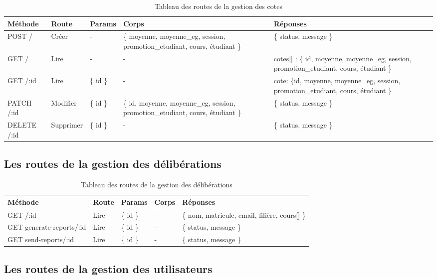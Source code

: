\begin{table}[ht]
  \caption{Tableau des routes de la gestion des cotes}
  \label{tab:routes-grade}
  \begin{tabular}{|p{1.5cm}|p{1cm}|p{1cm}|p{3cm}|p{4cm}| }
    \hline
    Méthode & Route & Params & Corps & Réponses \\
    \hline
        POST /  & Créer &  - &\{ moyenne, moyenne\_eg, session, promotion\_etudiant, cours, étudiant \} & \{ status, message \} \\
    \hline
        GET  / & Lire & - & - & cotes[] :  \{ id, moyenne, moyenne\_eg, session, promotion\_etudiant, cours, étudiant \} \\
    \hline
        GET  /:id  & Lire & \{ id \} & - & cote: \{id, moyenne, moyenne\_eg, session, promotion\_etudiant, cours, étudiant \} \\
    \hline
        PATCH /:id  & Modifier & \{ id \} & \{ id, moyenne, moyenne\_eg, session, promotion\_etudiant, cours, étudiant \} & \{ status, message \} \\
    \hline
        DELETE  /:id & Supprimer  & \{ id \} & - & \{ status, message \} \\
    \hline
  \end{tabular}
\end{table}
\pagebreak

\subsection{Les routes de la gestion des délibérations}\label{subsec:routes-deliberation}

\begin{table}[ht]
  \caption{Tableau des routes de la gestion des délibérations}
  \label{tab:routes-deliberation}
  \begin{tabular}{|p{2cm}|p{1cm}|p{1cm}|p{1.5cm}|p{4cm}| }
    \hline
    Méthode & Route & Params & Corps & Réponses \\
    \hline
    GET /:id & Lire &  \{ id \} & - & \{ nom, matricule, email, filière, cours[] \} \\
    \hline
    GET generate-reports/:id  & Lire &  \{ id \} & - & \{ status, message \} \\
    \hline
    GET send-reports/:id & Lire &  \{ id \} & - & \{ status, message \} \\
    \hline
  \end{tabular}
\end{table}
\pagebreak

\subsection{Les routes de la gestion des utilisateurs}\label{subsec:routes-user}


